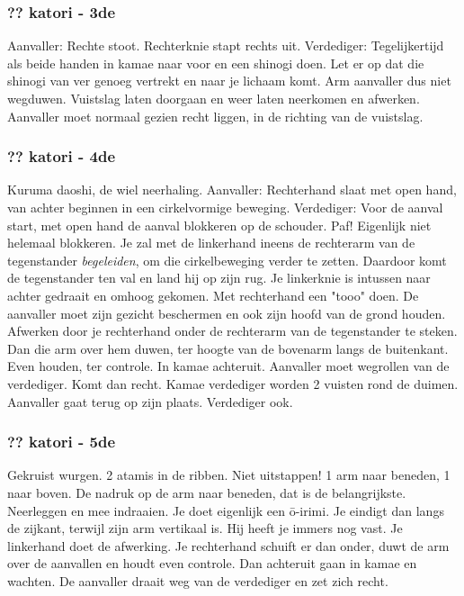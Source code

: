 \subsubsection{?? katori - 3de}
Aanvaller: Rechte stoot. Rechterknie stapt rechts uit.
Verdediger: Tegelijkertijd als beide handen in kamae naar voor en een shinogi doen.
Let er op dat die shinogi van ver genoeg vertrekt en naar je lichaam komt.
Arm aanvaller dus niet wegduwen.
Vuistslag laten doorgaan en weer laten neerkomen en afwerken.
Aanvaller moet normaal gezien recht liggen, in de richting van de vuistslag.

\subsubsection{?? katori - 4de}
Kuruma daoshi, de wiel neerhaling.
Aanvaller: Rechterhand slaat met open hand, van achter beginnen in een cirkelvormige beweging.
Verdediger: Voor de aanval start, met open hand de aanval blokkeren op de schouder. Paf!
Eigenlijk niet helemaal blokkeren. Je zal met de linkerhand ineens de rechterarm van de tegenstander \textit{begeleiden},
om die cirkelbeweging verder te zetten. Daardoor komt de tegenstander ten val en land hij op zijn rug.
Je linkerknie is intussen naar achter gedraait en omhoog gekomen.
Met rechterhand een "tooo" doen.
De aanvaller moet zijn gezicht beschermen en ook zijn hoofd van de grond houden.
Afwerken door je rechterhand onder de rechterarm van de tegenstander te steken. Dan die arm over hem duwen, ter hoogte van de bovenarm langs de buitenkant.
Even houden, ter controle.
In kamae achteruit.
Aanvaller moet wegrollen van de verdediger.
Komt dan recht.
Kamae verdediger worden 2 vuisten rond de duimen.
Aanvaller gaat terug op zijn plaats.
Verdediger ook.

\subsubsection{?? katori - 5de}
Gekruist wurgen.
2 atamis in de ribben.
Niet uitstappen!
1 arm naar beneden, 1 naar boven.
De nadruk op de arm naar beneden, dat is de belangrijkste.
Neerleggen en mee indraaien.
Je doet eigenlijk een \={o}-irimi.
Je eindigt dan langs de zijkant, terwijl zijn arm vertikaal is.
Hij heeft je immers nog vast.
Je linkerhand doet de afwerking.
Je rechterhand schuift er dan onder, duwt de arm over de aanvallen en houdt even controle.
Dan achteruit gaan in kamae en wachten.
De aanvaller draait weg van de verdediger en zet zich recht.


